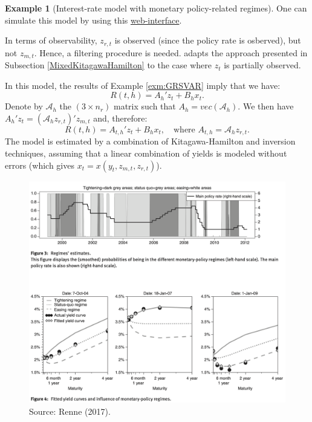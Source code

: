 \documentclass[
  12pt,
]{book}
\theoremstyle{definition}
\theoremstyle{definition}
\newtheorem{example}{Example}[chapter]
\theoremstyle{definition}
\theoremstyle{definition}
\theoremstyle{remark}
\begin{document}
\begin{example}[Interest-rate model with monetary policy-related regimes]
One can simulate this model by using this \href{https://fixed-income.shinyapps.io/NLIR/}{web-interface}.

In terms of observability, \(z_{r,t}\) is observed (since the policy rate is osberved), but not \(z_{m,t}\). Hence, a filtering procedure is needed. \citet{Renne_2017} adapts the approach presented in Subsection \ref{MixedKitagawaHamilton} to the case where \(z_{t}\) is partially observed.

In this model, the results of Example \ref{exm:GRSVAR} imply that we have:
\[
R(t,h) = A_h' z_t + B_h x_t.
\]
Denote by \(\mathcal{A}_h\) the \((3 \times n_r)\) matrix such that \(A_h = vec(\mathcal{A}_h)\). We then have \(A_h' z_t = (\mathcal{A}_h z_{r,t})' z_{m,t}\) and, therefore:
\[
R(t,h) = A_{t,h}' z_t + B_h x_t, \quad \mbox{where $A_{t,h} = \mathcal{A}_h z_{r,t}$.}
\]
The model is estimated by a combination of Kitagawa-Hamilton and inversion techniques, assuming that a linear combination of yields is modeled without errors (which gives \(x_t = x(y_t,z_{m,t},z_{r,t})\)).

\begin{figure}

{\centering \includegraphics[width=0.95\linewidth]{figures/Fig-SNDE} 

}

\caption{Source: Renne (2017).}\label{fig:figRenne2017}
\end{figure}

\end{example}
\end{document}
